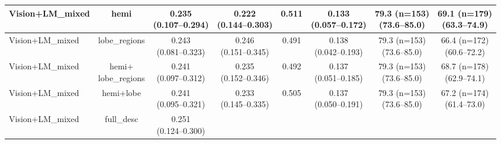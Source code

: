 \documentclass[FCD_GNN.tex]{subfiles}
\begin{document}
\begin{table}[H]
\begin{tabular}{lccccccc}
\hline
Vision+LM\_mixed & 
hemi &  
\makecell{0.235 \\ (0.107--0.294)} &
\makecell{0.222 \\ (0.144--0.303)} &
\colorbox{cyan!15}{0.511} &
\makecell{0.133 \\ (0.057--0.172)} &
\makecell{79.3 (n=153) \\ (73.6--85.0)} &
\makecell{\colorbox{orange!15}{69.1 (n=179)} \\ (63.3--74.9)} \\
\hline
Vision+LM\_mixed &
lobe\_regions &
\makecell{\colorbox{orange!15}{0.243} \\ (0.081--0.323)} &
\makecell{\colorbox{cyan!15}{0.246} \\ (0.151--0.345)} &
0.491 &
\makecell{\colorbox{orange!15}{0.138} \\ (0.042--0.193)} &
\makecell{79.3 (n=153) \\ (73.6--85.0)} &
\makecell{66.4 (n=172) \\ (60.6--72.2)} \\
\hline
Vision+LM\_mixed &
\makecell{hemi+ \\ lobe\_regions} &
\makecell{0.241 \\ (0.097--0.312)} &
\makecell{\colorbox{orange!15}{0.235} \\ (0.152--0.346)} &
0.492 &
\makecell{0.137 \\ (0.051--0.185)} &
\makecell{79.3 (n=153) \\ (73.6--85.0)} &
\makecell{68.7 (n=178) \\ (62.9--74.1)} \\
\hline
Vision+LM\_mixed &
hemi+lobe & 
\makecell{0.241 \\ (0.095--0.321)} &
\makecell{0.233 \\ (0.145--0.335)} &
\colorbox{orange!15}{0.505} &
\makecell{0.137 \\ (0.050--0.191)} &
\makecell{79.3 (n=153) \\ (73.6--85.0)} &
\makecell{67.2 (n=174) \\ (61.4--73.0)} \\
\hline
Vision+LM\_mixed &
full\_desc &
\makecell{\colorbox{cyan!15}{0.251} \\ (0.124--0.300)} &

\end{tabular}
\end{table}
\end{document}
